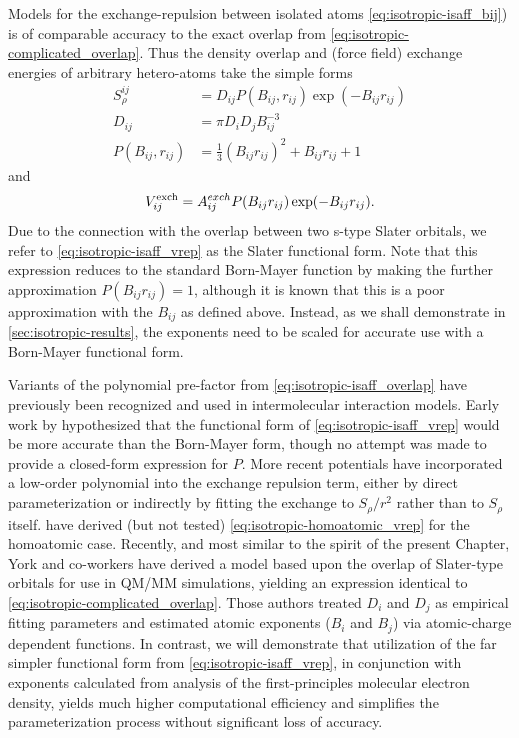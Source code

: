 \begin{subsection}{Models for the exchange-repulsion between isolated atoms}
\cref{eq:isotropic-isaff_bij}) is of comparable accuracy to the exact overlap from 
\cref{eq:isotropic-complicated_overlap}. 
Thus the density overlap and (force field) exchange energies of arbitrary hetero-atoms
take the simple forms
%
\begin{align}
\label{eq:isotropic-isaff_overlap}
S^{ij}_{\rho} &= D_{ij} P(B_{ij}, r_{ij}) \exp(-B_{ij}r_{ij}) \\
D_{ij} &= \pi D_i D_j B_{ij}^{-3} \\
P(B_{ij},r_{ij}) &= \frac13 (B_{ij} r_{ij})^2 + B_{ij} r_{ij} + 1
\end{align}
%
and
%
\begin{align}
\label{eq:isotropic-isaff_vrep}
V^{\text{exch}}_{ij} = A^{exch}_{ij} P(B_{ij} r_{ij}) \exp(-B_{ij}r_{ij}).
\end{align}
%
Due to the connection with the overlap between two s-type Slater orbitals, we refer
to \cref{eq:isotropic-isaff_vrep} as the Slater functional form. Note that this expression reduces
to the standard Born-Mayer function by making the further approximation $P(B_{ij}
r_{ij}) = 1$, although it is known\cite{Ihm1990, McDaniel2012} that 
this is a poor approximation with the $B_{ij}$ as defined above.
Instead, as we shall demonstrate in \cref{sec:isotropic-results}, the
exponents \B need to be scaled for accurate use with a Born-Mayer functional form.

Variants of the polynomial
pre-factor from \cref{eq:isotropic-isaff_overlap} have previously been recognized and
used in intermolecular interaction models.
\cite{Buckingham1938,McDaniel2012,Rappe1992}
Early work by  hypothesized that the functional form
of \cref{eq:isotropic-isaff_vrep} would be more accurate than the Born-Mayer
form, though no attempt was made to provide a closed-form expression for
$P$. More recent potentials have incorporated a low-order
polynomial into the exchange repulsion term, either by direct parameterization
\cite{Podeszwa2006, Bukowski2006, Jeziorska2007, Sum2002, Konieczny2015} 
or indirectly by fitting the exchange to ${S_{\rho}}/{r^2}$ rather than
to $S_{\rho}$ itself.
\cite{Kita1976a,Nyeland1986,Ihm1990}
\citeauthor{Kita1976a} have derived (but not tested) \cref{eq:isotropic-homoatomic_vrep} for
the homoatomic case.
\cite{Kita1976a}
Recently, and most similar to the spirit of the present Chapter,
York and co-workers have derived a model based upon the overlap of Slater-type orbitals
for use in QM/MM simulations, yielding an expression identical to
\cref{eq:isotropic-complicated_overlap}.
\cite{Kuechler2015,Giese2007,Giese2013} 
Those authors treated $D_i$ and $D_j$ as empirical fitting
parameters and estimated atomic exponents ($B_i$ and $B_j$) via atomic-charge dependent functions.
In contrast, we will demonstrate that utilization of the far simpler
functional form from \cref{eq:isotropic-isaff_vrep},
in conjunction with exponents calculated from analysis of the first-principles molecular electron density,
yields much higher computational efficiency and simplifies the
parameterization process without significant loss of accuracy.


\end{subsection}
